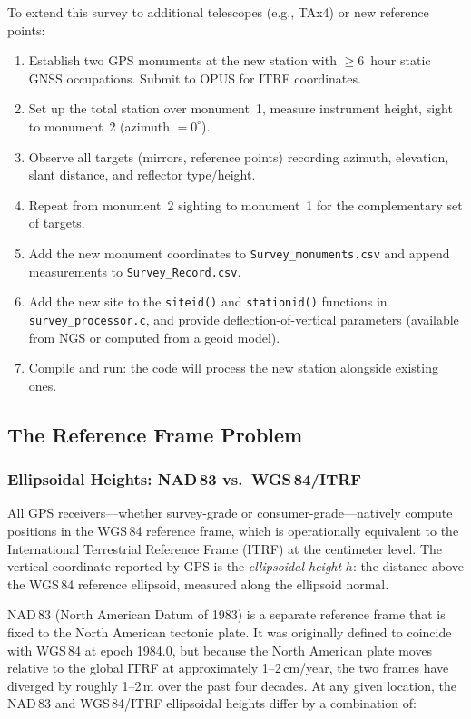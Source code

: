 \documentclass[11pt,letterpaper]{article}
\newcommand{\degree}{^\circ}
\begin{document}
To extend this survey to additional telescopes (e.g., TAx4) or new reference points:

\begin{enumerate}[nosep]
    \item Establish two GPS monuments at the new station with $\geq 6$~hour static GNSS occupations. Submit to OPUS for ITRF coordinates.
    \item Set up the total station over monument~1, measure instrument height, sight to monument~2 (azimuth $= 0\degree$).
    \item Observe all targets (mirrors, reference points) recording azimuth, elevation, slant distance, and reflector type/height.
    \item Repeat from monument~2 sighting to monument~1 for the complementary set of targets.
    \item Add the new monument coordinates to \texttt{Survey\_monuments.csv} and append measurements to \texttt{Survey\_Record.csv}.
    \item Add the new site to the \texttt{siteid()} and \texttt{stationid()} functions in \texttt{survey\_processor.c}, and provide deflection-of-vertical parameters (available from NGS or computed from a geoid model).
    \item Compile and run: the code will process the new station alongside existing ones.
\end{enumerate}

\subsection{The Reference Frame Problem}
\label{sec:frame_problem}

\subsubsection{Ellipsoidal Heights: NAD\,83 vs.\ WGS\,84/ITRF}

All GPS receivers---whether survey-grade or consumer-grade---natively compute positions in the WGS\,84 reference frame, which is operationally equivalent to the International Terrestrial Reference Frame (ITRF) at the centimeter level. The vertical coordinate reported by GPS is the \emph{ellipsoidal height} $h$: the distance above the WGS\,84 reference ellipsoid, measured along the ellipsoid normal.

NAD\,83 (North American Datum of 1983) is a separate reference frame that is fixed to the North American tectonic plate. It was originally defined to coincide with WGS\,84 at epoch 1984.0, but because the North American plate moves relative to the global ITRF at approximately 1--2\,cm/year, the two frames have diverged by roughly 1--2\,m over the past four decades. At any given location, the NAD\,83 and WGS\,84/ITRF ellipsoidal heights differ by a combination of:
\end{document}
